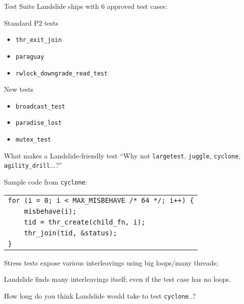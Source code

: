 \documentclass[xcolor=dvipsnames]{beamer}
\begin{document}
\begin{frame}{Test Suite}
	Landslide ships with 6 approved test cases:
	\linegap

	Standard P2 tests
	\begin{itemize}
		\item {\tt thr\_exit\_join}
		\item {\tt paraguay}
		\item {\tt rwlock\_downgrade\_read\_test}
	\end{itemize}

	New tests
	\begin{itemize}
		\item {\tt broadcast\_test}
		\item {\tt paradise\_lost} %
		\item {\tt mutex\_test} %
	\end{itemize}
\end{frame}

\begin{frame}{What makes a Landslide-friendly test}
	``Why not {\tt largetest}, {\tt juggle}, {\tt cyclone}, {\tt agility\_drill}...?''
	\linegap

	Sample code from {\tt cyclone}: %
	\begin{center}
	\begin{tabular}{l}
		\texttt{for (i = 0; i < MAX\_MISBEHAVE /* 64 */; i++) \{} \\
		\texttt{~~~~misbehave(i);} \\
		\texttt{~~~~tid = thr\_create(child\_fn, i);} \\
		\texttt{~~~~thr\_join(tid, \&status);} \\
		\texttt{\}}
	\end{tabular}
	\end{center}
	\pause
	\linegap

	Stress tests expose various interleavings using big loops/many threads;
	\linegap

	Landslide finds many interleavings itself; even if the test case has no loops.
	\vspace{0.01in}

	How long do you think Landslide would take to test {\tt cyclone}..?
\end{frame}
\end{document}
